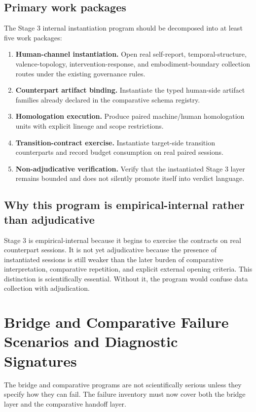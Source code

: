 \documentclass[11pt,a4paper]{article}
\theoremstyle{definition}
\begin{document}
\subsection{Primary work packages}
The Stage 3 internal instantiation program should be decomposed into at least five work packages:
\begin{enumerate}[leftmargin=1.5em]
\item \textbf{Human-channel instantiation.} Open real self-report, temporal-structure, valence-topology, intervention-response, and embodiment-boundary collection routes under the existing governance rules.
\item \textbf{Counterpart artifact binding.} Instantiate the typed human-side artifact families already declared in the comparative schema registry.
\item \textbf{Homologation execution.} Produce paired machine/human homologation units with explicit lineage and scope restrictions.
\item \textbf{Transition-contract exercise.} Instantiate target-side transition counterparts and record budget consumption on real paired sessions.
\item \textbf{Non-adjudicative verification.} Verify that the instantiated Stage 3 layer remains bounded and does not silently promote itself into verdict language.
\end{enumerate}

\subsection{Why this program is empirical-internal rather than adjudicative}
Stage 3 is empirical-internal because it begins to exercise the contracts on real counterpart sessions. It is not yet adjudicative because the presence of instantiated sessions is still weaker than the later burden of comparative interpretation, comparative repetition, and explicit external opening criteria. This distinction is scientifically essential. Without it, the program would confuse data collection with adjudication.

\section{Bridge and Comparative Failure Scenarios and Diagnostic Signatures}
The bridge and comparative programs are not scientifically serious unless they specify how they can fail. The failure inventory must now cover both the bridge layer and the comparative handoff layer.
\end{document}
